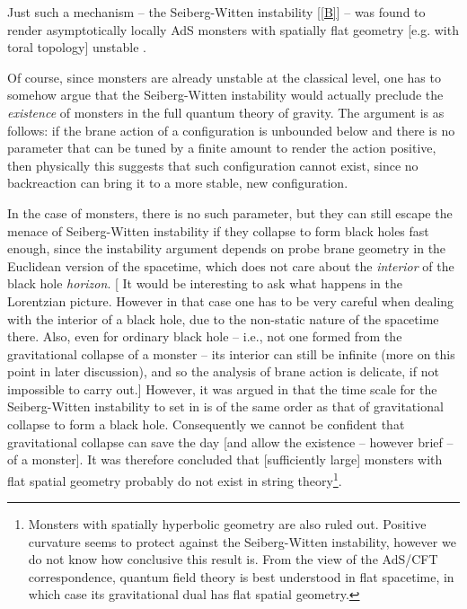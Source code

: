 \documentclass[12pt]{article}
\newcommand{\2}{$^2$}
\newcommand{\3}{$^3$}
\newcommand{\4}{$_4$}
\newcommand{\5}{$_5$}
\begin{document}

Just such a mechanism -- the Seiberg-Witten instability [\ref{B}] -- was found to render asymptotically locally AdS monsters with spatially flat geometry [e.g. with toral topology] unstable \cite{ycmonster}. 




Of course, since monsters are already unstable at the classical level, one has to somehow argue that the Seiberg-Witten instability would actually preclude the \emph{existence} of monsters in the full quantum theory of gravity. The argument is as follows: if the brane action of a configuration is unbounded below and there is no parameter that can be tuned by a finite amount to render the action positive, then physically this suggests that such configuration cannot exist, since no backreaction can bring it to a more stable, new configuration.

In the case of monsters, there is no such parameter, but they can still escape the menace of Seiberg-Witten instability if they collapse to form black holes fast enough, since the instability argument depends on probe brane geometry in the Euclidean version of the spacetime, which does not care about the \emph{interior} of the black hole \emph{horizon}. [{\color{black} It would be interesting to ask what happens in the Lorentzian picture. However in that case one has to be very careful when dealing with the interior of a black hole, due to the non-static nature of the spacetime there. Also, even for ordinary black hole -- i.e., not one formed from the gravitational collapse of a monster -- its interior can still be infinite (more on this point in later discussion), and so the analysis of brane action is delicate, if not impossible to carry out.}] However, it was argued in \cite{ycmonster} that the time scale for the Seiberg-Witten instability to set in is of the same order as that of gravitational collapse to form a black hole. Consequently we cannot be confident that gravitational collapse can save the day [and allow the existence -- however brief -- of a monster]. It was therefore concluded that [sufficiently large] monsters with flat spatial geometry probably do not exist in string theory\footnote{Monsters with spatially hyperbolic geometry are also ruled out. Positive curvature seems to protect against the Seiberg-Witten instability, however we do not know how conclusive this result is. From the view of the AdS/CFT correspondence, quantum field theory is best understood in flat spacetime, in which case its gravitational dual has flat spatial geometry.}. 
\end{document}
